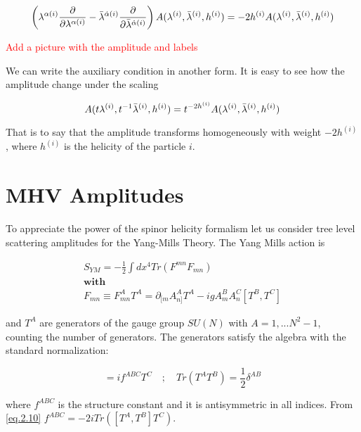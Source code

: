 \begin{equation}
\left( \lambda^{\alpha(i)} \frac{\partial}{\partial\lambda^{\alpha(i)}} - \bar{\lambda}^{\dot{\alpha}(i)} \frac{\partial}{\partial\bar{\lambda}^{\dot{\alpha}(i)}} \right)A(\lambda^{(i)},\bar{\lambda}^{(i)},h^{(i)}) = -2h^{(i)}A(\lambda^{(i)},\bar{\lambda}^{(i)},h^{(i)})
\end{equation}


\textcolor{red}{Add a picture with the amplitude and labels}

We can write the auxiliary condition in another form. It is easy to see how the amplitude change under the scaling

\begin{equation}
A(t\lambda^{(i)},t^{-1}\bar{\lambda}^{(i)},h^{(i)}) = t^{-2h^{(i)}} A(\lambda^{(i)},\bar{\lambda}^{(i)},h^{(i)})
\label{eq.2.15}
\end{equation}

That is to say that the amplitude transforms homogeneously with weight $-2h^{(i)}$, where $h^{(i)}$ is the helicity of the particle $i$. 

\section{MHV Amplitudes}


To appreciate  the power of the spinor helicity formalism let us consider tree level scattering amplitudes for the Yang-Mills Theory. The Yang Mills action is 


\begin{align}
S_{YM} =  -\frac{1}{2}\int dx^{4} Tr(F^{mn}F_{mn}) \\
\textbf{with}\\
F_{mn} \equiv  F^{A}_{mn} T^{A} = \partial_{[m}A_{n]}^{A} T^{A} -igA_{m}^{B}A_{n}^{C}[T^{B},T^{C}]
\label{eq.2.11}
\end{align}

 and $T^{A}$ are generators of the  gauge group $SU(N)$ with $A = 1,...N^{2} -1$, counting the number of generators. The generators satisfy the algebra with the standard normalization:


\begin{equation}
[T^{A},T^{B}] = i f^{ABC}T^{C} \quad ; \quad Tr (T^{A}T^{B}) = \frac{1}{2}\delta^{AB}
\label{eq.2.10}
\end{equation}

 where $f^{ABC}$ is the structure constant and it is antisymmetric in all indices. From \eqref{eq.2.10} $f^{ABC} = -2iTr([T^{A},T^{B}]T^{C})$. 
 
